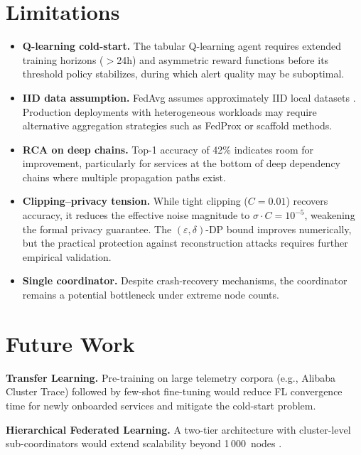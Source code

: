 \section{Limitations}
\label{sec:conclusion_limitations}

\begin{itemize}
    \item \textbf{Q-learning cold-start.} The tabular Q-learning agent
    requires extended training horizons (${>}$24h) and asymmetric reward
    functions before its threshold policy stabilizes, during which alert
    quality may be suboptimal.

    \item \textbf{IID data assumption.} FedAvg assumes approximately IID
    local datasets \cite{li2020federated}. Production deployments with
    heterogeneous workloads may require alternative aggregation strategies
    such as FedProx or scaffold methods.

    \item \textbf{RCA on deep chains.} Top-1 accuracy of 42\% indicates
    room for improvement, particularly for services at the bottom of deep
    dependency chains where multiple propagation paths exist.

    \item \textbf{Clipping--privacy tension.} While tight clipping
    ($C{=}0.01$) recovers accuracy, it reduces the effective noise magnitude
    to $\sigma \cdot C = 10^{-5}$, weakening the formal privacy guarantee.
    The $(\varepsilon, \delta)$-DP bound improves numerically, but the
    practical protection against reconstruction attacks requires further
    empirical validation.

    \item \textbf{Single coordinator.} Despite crash-recovery mechanisms,
    the coordinator remains a potential bottleneck under extreme node counts.
\end{itemize}

\section{Future Work}
\label{sec:conclusion_future}

\textbf{Transfer Learning.} Pre-training on large telemetry corpora (e.g.,
Alibaba Cluster Trace) followed by few-shot fine-tuning would reduce FL
convergence time for newly onboarded services and mitigate the cold-start
problem.

\textbf{Hierarchical Federated Learning.} A two-tier architecture with
cluster-level sub-coordinators would extend scalability beyond 1\,000~nodes
\cite{kairouz2021advances}.

